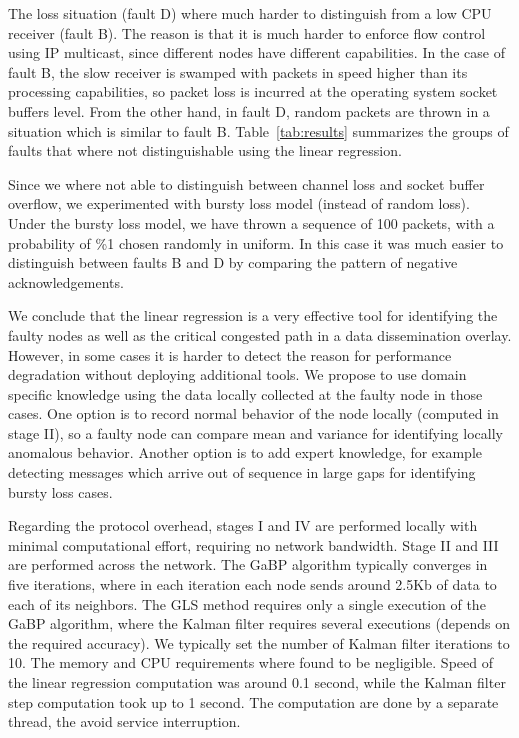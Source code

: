 \documentclass[times, 10pt,twocolumn]{article}
\begin{document}
The loss situation (fault D) where much harder to distinguish from a low CPU receiver (fault B). The reason
is that it is much harder to enforce flow control using IP multicast, since different nodes have different capabilities. In the case of fault B, the slow receiver is swamped with packets in speed higher than its processing capabilities, so packet
loss is incurred at the operating system socket buffers level. From the other hand, in fault D, random packets
are thrown in a situation which is similar to fault B. Table~\ref{tab:results} summarizes the groups of faults that where not distinguishable using the linear regression.

Since we where not able to distinguish between channel loss and socket buffer overflow, we experimented
with bursty loss model (instead of random loss). Under the bursty loss model, we have thrown a sequence of 100 packets, with a probability of \%1 chosen randomly in uniform. In this case it was much easier to distinguish between faults
B and D by comparing the pattern of negative acknowledgements.

We conclude that the linear regression is a very effective tool for identifying the faulty nodes as well
as the critical congested path in a data dissemination overlay. However, in some cases it is harder to detect
the reason for performance degradation without deploying additional tools. We propose to use domain specific
knowledge using the data locally collected at the faulty node in those cases. One option is to record normal
behavior of the node locally (computed in stage II), so a faulty node can compare mean and variance for identifying
locally anomalous behavior. Another option is to add expert knowledge, for example detecting messages which arrive
out of sequence in large gaps for identifying bursty loss cases.





Regarding the protocol overhead, stages I and IV are performed locally with minimal computational effort, requiring no
network bandwidth. Stage II and III are performed across the network. The GaBP algorithm typically converges in five iterations, where in each iteration each node sends around 2.5Kb of data to each of its neighbors.  The GLS method
requires only a single execution of the GaBP algorithm, where the Kalman filter requires several executions (depends
on the required accuracy). We typically set the number of Kalman filter iterations to 10. The memory and CPU
requirements where found to be negligible. Speed of the linear regression computation was around 0.1 second, while
the Kalman filter step computation took up to 1 second. The computation are done by a separate thread, the avoid
service interruption.
\end{document}
